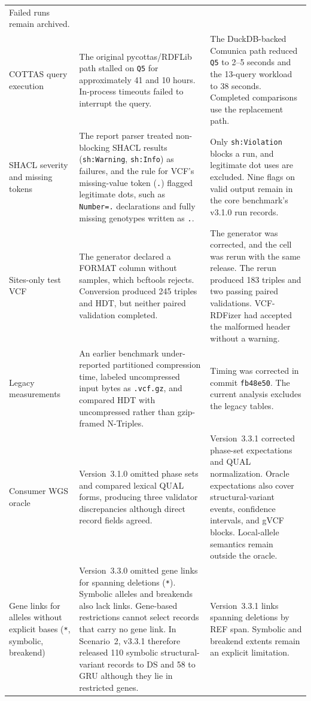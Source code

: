 \documentclass[11pt]{article}
\begin{document}
\begin{longtable}{@{}>{\raggedright\arraybackslash}p{}>{\raggedright\arraybackslash}p{}>{\raggedright\arraybackslash}p{}@{}}
Failed runs remain archived.\\
\addlinespace
COTTAS query execution & The original pycottas/RDFLib path stalled on \texttt{Q5} for approximately 41 and 10 hours.
In-process timeouts failed to interrupt the query. & The DuckDB-backed Comunica path reduced \texttt{Q5} to 2--5 seconds and the 13-query workload to 38 seconds.
Completed comparisons use the replacement path.\\
\addlinespace
SHACL severity and missing tokens & The report parser treated non-blocking SHACL results (\texttt{sh:Warning}, \texttt{sh:Info}) as failures, and the rule for VCF's missing-value token (\texttt{.}) flagged legitimate dots, such as \texttt{Number=.} declarations and fully missing genotypes written as \texttt{.}. & Only \texttt{sh:Violation} blocks a run, and legitimate dot uses are excluded.
Nine flags on valid output remain in the core benchmark's v3.1.0 run records.\\
\addlinespace
Sites-only test VCF & The generator declared a FORMAT column without samples, which bcftools rejects.
Conversion produced 245 triples and HDT, but neither paired validation completed. & The generator was corrected, and the cell was rerun with the same release.
The rerun produced 183 triples and two passing paired validations.
VCF-RDFizer had accepted the malformed header without a warning.\\
\addlinespace
Legacy measurements & An earlier benchmark under-reported partitioned compression time, labeled uncompressed input bytes as \texttt{.vcf.gz}, and compared HDT with uncompressed rather than gzip-framed N-Triples. & Timing was corrected in commit \texttt{fb48e50}.
The current analysis excludes the legacy tables.\\
\addlinespace
Consumer WGS oracle & Version~3.1.0 omitted phase sets and compared lexical QUAL forms, producing three validator discrepancies although direct record fields agreed. & Version~3.3.1 corrected phase-set expectations and QUAL normalization.
Oracle expectations also cover structural-variant events, confidence intervals, and gVCF blocks.
Local-allele semantics remain outside the oracle.\\
\addlinespace
Gene links for alleles without explicit bases (\texttt{*}, symbolic, breakend) & Version~3.3.0 omitted gene links for spanning deletions (\texttt{*}).
Symbolic alleles and breakends also lack links.
Gene-based restrictions cannot select records that carry no gene link.
In Scenario~2, v3.3.1 therefore released 110 symbolic structural-variant records to DS and 58 to GRU although they lie in restricted genes. & Version~3.3.1 links spanning deletions by REF span.
Symbolic and breakend extents remain an explicit limitation.\\
\end{longtable}



\end{document}
